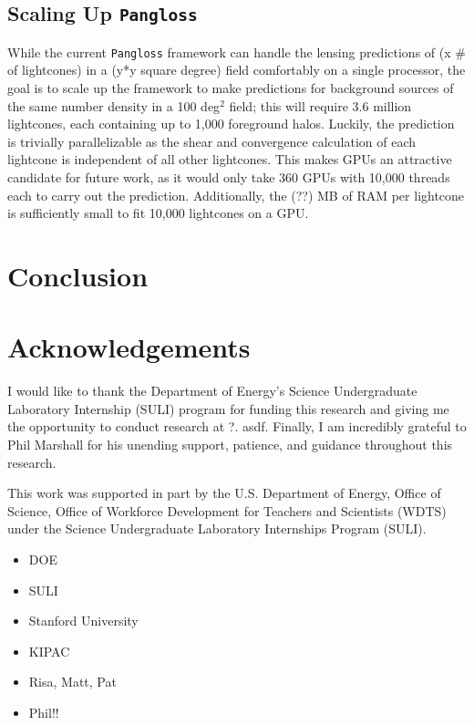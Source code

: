 \documentclass[%
 reprint,
 amsmath,amssymb,
 aps,
]{revtex4-1}
\begin{document}
\subsection*{Scaling Up \texttt{Pangloss}}

While the current \texttt{Pangloss} framework can handle the lensing predictions of (x \# of lightcones) in a (y*y square degree) field comfortably on a single processor, the goal is to scale up the framework to make predictions for background sources of the same number density in a 100 deg$^2$ field; this will require 3.6 million lightcones, each containing up to 1,000 foreground halos. Luckily, the prediction is trivially parallelizable as the shear and convergence calculation of each lightcone is independent of all other lightcones. This makes GPUs an attractive candidate for future work, as it would only take 360 GPUs with 10,000 threads each to carry out the prediction. Additionally, the (??) MB of RAM per lightcone is sufficiently small to fit 10,000 lightcones on a GPU.

\section{Conclusion}


\section{Acknowledgements}

I would like to thank the Department of Energy's Science Undergraduate Laboratory Internship (SULI) program for funding this research and giving me the opportunity to conduct research at ?. asdf. Finally, I am incredibly grateful to Phil Marshall for his unending support, patience, and guidance throughout this research.

This work was supported in part by the U.S. Department of Energy, Office of Science, Office of Workforce Development for Teachers and Scientists (WDTS) under the Science Undergraduate Laboratory Internships Program (SULI).

\begin{itemize}
\item DOE
\item SULI
\item Stanford University
\item KIPAC
\item Risa, Matt, Pat
\item Phil!!
\end{itemize}
\end{document}
